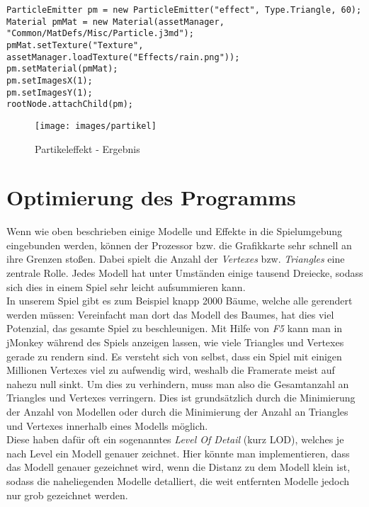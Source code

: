 \begin{lstlisting}
ParticleEmitter pm = new ParticleEmitter("effect", Type.Triangle, 60);
Material pmMat = new Material(assetManager, "Common/MatDefs/Misc/Particle.j3md");
pmMat.setTexture("Texture", assetManager.loadTexture("Effects/rain.png"));
pm.setMaterial(pmMat);
pm.setImagesX(1);
pm.setImagesY(1);
rootNode.attachChild(pm);
\end{lstlisting}

\begin{figure}[H]
	\myfloatalign
	
	\texttt{[image: images/partikel]} 
	\caption{Partikeleffekt - Ergebnis}
	
\end{figure}

\pagebreak

\section{Optimierung des Programms}\label{sec:optimizing}
Wenn wie oben beschrieben einige Modelle und Effekte in die Spielumgebung eingebunden werden, können der Prozessor bzw. die Grafikkarte sehr schnell an ihre Grenzen stoßen. Dabei spielt die Anzahl der \emph{Vertexes} bzw. \emph{Triangles} eine zentrale Rolle. Jedes Modell hat unter Umständen einige tausend Dreiecke, sodass sich dies in einem Spiel sehr leicht aufsummieren kann. \\
In unserem Spiel gibt es zum Beispiel knapp 2000 Bäume, welche alle gerendert werden müssen: Vereinfacht man dort das Modell des Baumes, hat dies viel Potenzial, das gesamte Spiel zu beschleunigen. Mit Hilfe von \emph{F5} kann man in jMonkey während des Spiels anzeigen lassen, wie viele Triangles und Vertexes gerade zu rendern sind. Es versteht sich von selbst, dass ein Spiel mit einigen Millionen Vertexes viel zu aufwendig wird, weshalb die Framerate meist auf nahezu null sinkt. Um dies zu verhindern, muss man also die Gesamtanzahl an Triangles und Vertexes verringern. Dies ist grundsätzlich durch die Minimierung der Anzahl von Modellen oder durch die Minimierung der Anzahl an Triangles und Vertexes innerhalb eines Modells möglich. \\
Diese haben dafür oft ein sogenanntes \emph{Level Of Detail} (kurz LOD), welches je nach Level ein Modell genauer zeichnet. Hier könnte man implementieren, dass das Modell genauer gezeichnet wird, wenn die Distanz zu dem Modell klein ist, sodass die naheliegenden Modelle detalliert, die weit entfernten Modelle jedoch nur grob gezeichnet werden.

